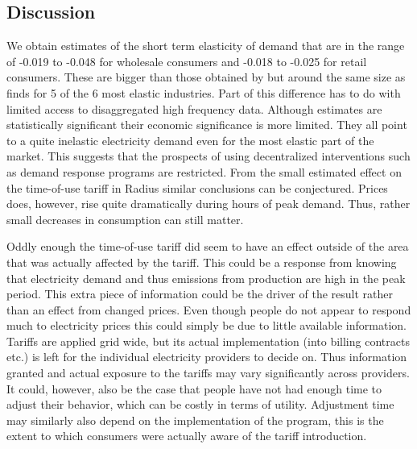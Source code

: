\begin{comment}
Takes from table 11:
* Effect mainly driven by DK1. DK2 smaller estimate and insignificant, but can be due to large standard errors smaller sample size of only 9 clusters
*Overall constant over time => cannot reject elasticities are the same.
Takes from table 12 - Estimation of largest grid companies separately:
*Cerius weird ass.
*differ a lot in magnitude
*Evonet has very high effect from no of meters
Takes from table 13:
* Changes over time elasticity. Highest in 2016, lowest in 2017. I don't know any explanations
\end{comment}



\subsection{Discussion}
\label{subsec:r_discussion}
We obtain estimates of the short term elasticity of demand that are in the range of -0.019 to -0.048 for wholesale consumers and -0.018 to -0.025 for retail consumers. These are bigger than those obtained by \citet{lijesen2007real} but around the same size as \citet{wolak2001impact} finds for 5 of the 6 most elastic industries. Part of this difference has to do with limited access to disaggregated high frequency data. Although estimates are statistically significant their economic significance is more limited. They all point to a quite inelastic electricity demand even for the most elastic part of the market. This suggests that the prospects of using decentralized interventions such as demand response programs are restricted. From the small estimated effect on the time-of-use tariff in Radius similar conclusions can be conjectured. Prices does, however, rise quite dramatically during hours of peak demand. Thus, rather small decreases in consumption can still matter. %
\bigskip

Oddly enough the time-of-use tariff did seem to have an effect outside of the area that was actually affected by the tariff. This could be a response from knowing that electricity demand and thus emissions from production are high in the peak period. This extra piece of information could be the driver of the result rather than an effect from changed prices. Even though people do not appear to respond much to electricity prices this could simply be due to little available information. Tariffs are applied grid wide, but its actual implementation (into billing contracts etc.) is left for the individual electricity providers to decide on. Thus information granted and actual exposure to the tariffs may vary significantly across providers. It could, however, also be the case that people have not had enough time to adjust their behavior, which can be costly in terms of utility. Adjustment time may similarly also depend on the implementation of the program, this is the extent to which consumers were actually aware of the tariff introduction.
\bigskip

